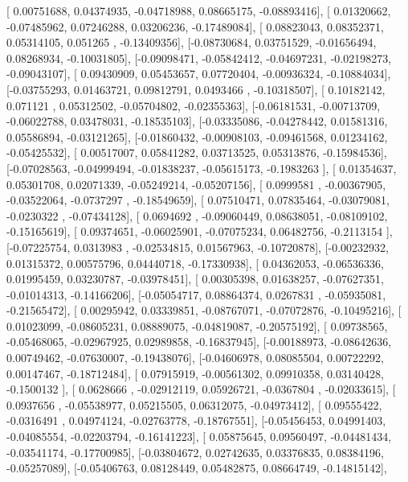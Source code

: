 \documentclass{article}
\begin{document}
       [ 0.00751688,  0.04374935, -0.04718988,  0.08665175, -0.08893416],
       [ 0.01320662, -0.07485962,  0.07246288,  0.03206236, -0.17489084],
       [ 0.08823043,  0.08352371,  0.05314105,  0.051265  , -0.13409356],
       [-0.08730684,  0.03751529, -0.01656494,  0.08268934, -0.10031805],
       [-0.09098471, -0.05842412, -0.04697231, -0.02198273, -0.09043107],
       [ 0.09430909,  0.05453657,  0.07720404, -0.00936324, -0.10884034],
       [-0.03755293,  0.01463721,  0.09812791,  0.0493466 , -0.10318507],
       [ 0.10182142,  0.071121  ,  0.05312502, -0.05704802, -0.02355363],
       [-0.06181531, -0.00713709, -0.06022788,  0.03478031, -0.18535103],
       [-0.03335086, -0.04278442,  0.01581316,  0.05586894, -0.03121265],
       [-0.01860432, -0.00908103, -0.09461568,  0.01234162, -0.05425532],
       [ 0.00517007,  0.05841282,  0.03713525,  0.05313876, -0.15984536],
       [-0.07028563, -0.04999494, -0.01838237, -0.05615173, -0.1983263 ],
       [ 0.01354637,  0.05301708,  0.02071339, -0.05249214, -0.05207156],
       [ 0.0999581 , -0.00367905, -0.03522064, -0.0737297 , -0.18549659],
       [ 0.07510471,  0.07835464, -0.03079081, -0.0230322 , -0.07434128],
       [ 0.0694692 , -0.09060449,  0.08638051, -0.08109102, -0.15165619],
       [ 0.09374651, -0.06025901, -0.07075234,  0.06482756, -0.2113154 ],
       [-0.07225754,  0.0313983 , -0.02534815,  0.01567963, -0.10720878],
       [-0.00232932,  0.01315372,  0.00575796,  0.04440718, -0.17330938],
       [ 0.04362053, -0.06536336,  0.01995459,  0.03230787, -0.03978451],
       [ 0.00305398,  0.01638257, -0.07627351, -0.01014313, -0.14166206],
       [-0.05054717,  0.08864374,  0.0267831 , -0.05935081, -0.21565472],
       [ 0.00295942,  0.03339851, -0.08767071, -0.07072876, -0.10495216],
       [ 0.01023099, -0.08605231,  0.08889075, -0.04819087, -0.20575192],
       [ 0.09738565, -0.05468065, -0.02967925,  0.02989858, -0.16837945],
       [-0.00188973, -0.08642636,  0.00749462, -0.07630007, -0.19438076],
       [-0.04606978,  0.08085504,  0.00722292,  0.00147467, -0.18712484],
       [ 0.07915919, -0.00561302,  0.09910358,  0.03140428, -0.1500132 ],
       [ 0.0628666 , -0.02912119,  0.05926721, -0.0367804 , -0.02033615],
       [ 0.0937656 , -0.05538977,  0.05215505,  0.06312075, -0.04973412],
       [ 0.09555422, -0.0316491 ,  0.04974124, -0.02763778, -0.18767551],
       [-0.05456453,  0.04991403, -0.04085554, -0.02203794, -0.16141223],
       [ 0.05875645,  0.09560497, -0.04481434, -0.03541174, -0.17700985],
       [-0.03804672,  0.02742635,  0.03376835,  0.08384196, -0.05257089],
       [-0.05406763,  0.08128449,  0.05482875,  0.08664749, -0.14815142],
\end{document}
